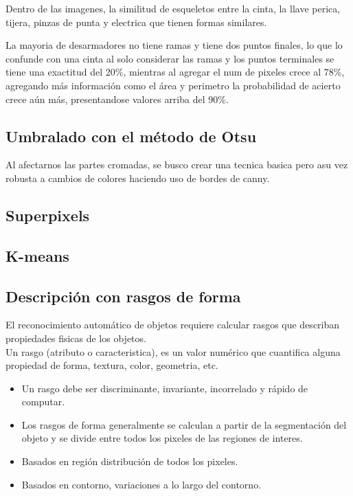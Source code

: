 \documentclass[a4paper, 11pt]{article}
\begin{document}
Dentro de las imagenes, la similitud de esqueletos entre la cinta, la llave perica, tijera, pinzas de punta y electrica que tienen formas similares.

La mayoria de desarmadores no tiene ramas y tiene dos puntos finales, lo que lo confunde con una cinta al solo considerar las ramas y los puntos terminales se tiene una exactitud del 20\%, mientras al agregar el num de pixeles crece al 78\%, agregando más información como el área y perimetro la probabilidad de acierto crece aún más, presentandose valores arriba del 90\%.

\subsection{Umbralado con el método de Otsu}

Al afectarnos las partes cromadas, se busco crear una tecnica basica pero asu vez robusta a cambios de colores haciendo uso de bordes de canny.\\

\subsection{Superpixels}

\subsection{K-means}

\subsection{Descripción con rasgos de forma}

El reconocimiento automático de objetos requiere calcular rasgos que describan propiedades fisicas de los objetos.\\

Un rasgo (atributo o caracteristica), es un valor numérico que cuantifica alguna propiedad de forma, textura, color, geometria, etc.

\begin{itemize}
\item Un rasgo debe ser discriminante, invariante, incorrelado y rápido de computar.
\item Los rasgos de forma generalmente se calculan a partir de la segmentación del objeto y se divide entre todos los pixeles de las regiones de interes.
\item Basados en región distribución de todos los pixeles.
\item Basados en contorno, variaciones a lo largo del contorno.
\end{itemize}
\end{document}
